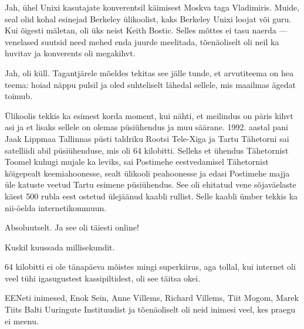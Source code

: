 
Jah, ühel Unixi kasutajate konverentsil käimisest Moskva taga Vladimiris. Muide, seal olid kohal esinejad Berkeley ülikoolist, 
kaks Berkeley Unixi loojat või guru. Kui õigesti mäletan, oli üks neist 
Keith Bostic. Selles mõttes ei tasu naerda --- venelased suutsid need mehed 
enda juurde meelitada, tõenäoliselt oli neil ka huvitav ja konverents oli 
megakihvt.


Jah, oli küll. Tagantjärele mõeldes tekitas see jälle tunde, et arvutiteema on hea 
teema: hoiad näppu pulsil ja oled suhteliselt lähedal sellele, mis 
maailmas ägedat toimub.

Ülikoolis tekkis ka esimest korda moment, kui nähti, et meilindus on päris 
kihvt asi ja et lisaks sellele on olemas püsiühendus ja muu säärane. 1992. 
aastal pani Jaak Lippmaa 
Tallinnas püsti taldriku Rootsi Tele-Xiga ja Tartu Tähetorni sai satelliidi abil püsiühenduse, mis oli 64 kilobitti. Selleks et 
ühendus Tähetornist Toomel kuhugi mujale ka leviks, sai Postimehe 
eestvedamisel Tähetornist kõigepealt keemiahoonesse, sealt ülikooli peahoonesse ja edasi Postimehe majja 
üle katuste veetud Tartu esimene püsiühendus. See oli ehitatud vene 
sõjaväelaste käest 500 rubla eest ostetud ülejäänud kaabli rullist.
Selle kaabli ümber tekkis ka nii-öelda internetikommuun. 


Absoluutselt. Ja see oli täiesti online!


Kuskil kuussada millisekundit.


64 kilobitti ei ole tänapäeva mõistes mingi superkiirus, aga 
tollal, kui internet oli veel tühi igasugustest kassipiltidest, oli see 
täitsa okei.


EENeti inimesed, Enok Sein, 
Anne Villems, Richard Villems, 
Tiit Mogom, Marek Tiits Balti Uuringute Instituudist ja tõenäoliselt oli neid inimesi 
veel, kes praegu ei meenu.

